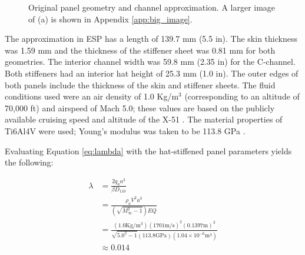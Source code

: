 \documentclass[a4paper, 12pt]{article}
\begin{document}
\begin{figure}[H] 
  \centering
  \caption{Original panel geometry and channel approximation.
           A larger image of (a) is shown in Appendix \ref{app:big_image}.}
  \label{fig:panel_geom}
\end{figure}

\noindent
The approximation in ESP has a length of 139.7 mm (5.5 in). 
The skin thickness was 1.59 mm and the thickness of the stiffener 
sheet was 0.81 mm for both geometries. 
The interior channel width was 59.8 mm (2.35 in) for the C-channel.
Both stiffeners had an interior hat height of 25.3 mm (1.0 in).
The outer edges of both panels include the thickness of the skin 
and stiffener sheets.
The fluid conditions used were an air density of 1.0 Kg/m$^3$ 
(corresponding to an altitude of 70,000 ft) 
and airspeed of Mach 5.0; 
these values are based on the publicly available cruising speed 
and altitude of the X-51 \cite{bib:x51_factsheet}.
The material properties of Ti6Al4V were used; 
Young's modulus was taken to be 113.8 GPa \cite{bib:ti6al4v}.

Evaluating Equation \ref{eq:lambda} with the hat-stiffened panel
parameters yields the following:

\begin{align*}
\lambda 
 &= \frac{2 q_a a^3}{\beta D_{110}} \\
 &= \frac{\rho_a V^2 a^3}{ (\sqrt{M_{\infty}^2 -1}) E Q} \\
 &= \frac{(1.0 \text{Kg}/\text{m}^3) (1701 \text{m}/\text{s})^2 (0.1397 \text{m})^3}{ \sqrt{5.0^2 -1} (113.8 \text{GPa}) (1.04\times 10^{-6} \text{m}^3)} \\
 &\approx 0.014
\end{align*}
\end{document}

